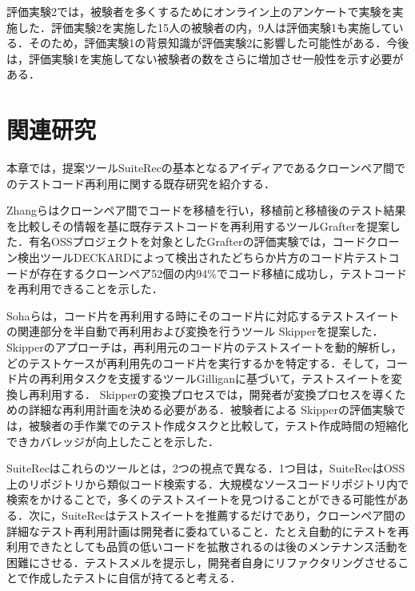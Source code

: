 \documentclass[12pt]{jarticle} %
\begin{document}
評価実験2では，被験者を多くするためにオンライン上のアンケートで実験を実施した．評価実験2を実施した15人の被験者の内，9人は評価実験1も実施している．そのため，評価実験1の背景知識が評価実験2に影響した可能性がある．今後は，評価実験1を実施してない被験者の数をさらに増加させ一般性を示す必要がある．




\newpage
\section{関連研究}
本章では，提案ツール{\sf SuiteRec}の基本となるアイディアであるクローンペア間でのテストコード再利用に関する既存研究を紹介する．

Zhangら\cite{Zhang2017}はクローンペア間でコードを移植を行い，移植前と移植後のテスト結果を比較しその情報を基に既存テストコードを再利用するツール{\sf Grafter}を提案した．有名OSSプロジェクトを対象とした{\sf Grafter}の評価実験では，コードクローン検出ツール{\sf DECKARD}\cite{Jiang2007}によって検出されたどちらか片方のコード片テストコードが存在するクローンペア52個の内94\%でコード移植に成功し，テストコードを再利用できることを示した．

Sohaら\cite{skipper}は，コード片を再利用する時にそのコード片に対応するテストスイートの関連部分を半自動で再利用および変換を行うツール{ \sf Skipper}を提案した．{ \sf Skipper}のアプローチは，再利用元のコード片のテストスイートを動的解析し，どのテストケースが再利用先のコード片を実行するかを特定する．そして，コード片の再利用タスクを支援するツール{\sf Gilligan}\cite{gilligan10}\cite{gilligan34}に基づいて，テストスイートを変換し再利用する．{ \sf Skipper}の変換プロセスでは，開発者が変換プロセスを導くための詳細な再利用計画を決める必要がある．被験者による{ \sf Skipper}の評価実験では，被験者の手作業でのテスト作成タスクと比較して，テスト作成時間の短縮化できカバレッジが向上したことを示した．

{\sf SuiteRec}はこれらのツールとは，2つの視点で異なる．1つ目は，{\sf SuiteRec}はOSS上のリポジトリから類似コード検索する．大規模なソースコードリポジトリ内で検索をかけることで，多くのテストスイートを見つけることができる可能性がある．次に，{\sf SuiteRec}はテストスイートを推薦するだけであり，クローンペア間の詳細なテスト再利用計画は開発者に委ねていること．たとえ自動的にテストを再利用できたとしても品質の低いコードを拡散されるのは後のメンテナンス活動を困難にさせる．テストスメルを提示し，開発者自身にリファクタリングさせることで作成したテストに自信が持てると考える．

\newpage
\end{document}
